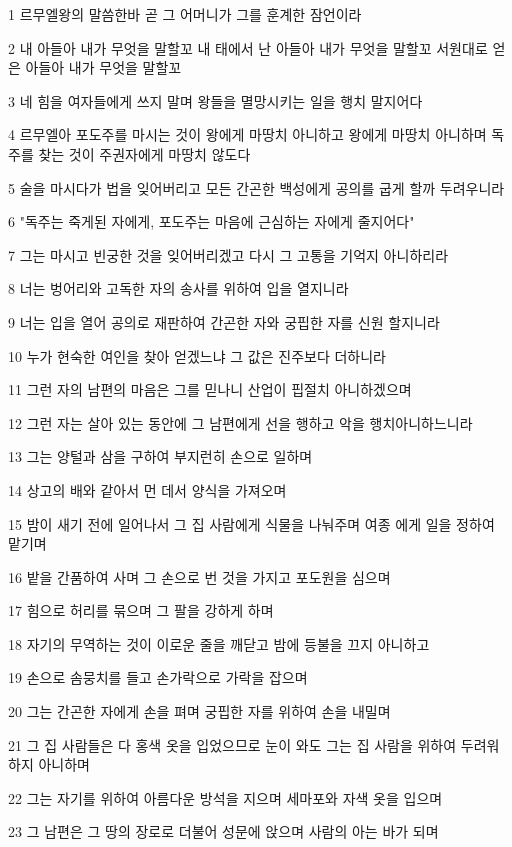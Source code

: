 \par 1 르무엘왕의 말씀한바 곧 그 어머니가 그를 훈계한 잠언이라
\par 2 내 아들아 내가 무엇을 말할꼬 내 태에서 난 아들아 내가 무엇을 말할꼬 서원대로 얻은 아들아 내가 무엇을 말할꼬
\par 3 네 힘을 여자들에게 쓰지 말며 왕들을 멸망시키는 일을 행치 말지어다
\par 4 르무엘아 포도주를 마시는 것이 왕에게 마땅치 아니하고 왕에게 마땅치 아니하며 독주를 찾는 것이 주권자에게 마땅치 않도다
\par 5 술을 마시다가 법을 잊어버리고 모든 간곤한 백성에게 공의를 굽게 할까 두려우니라
\par 6 "독주는 죽게된 자에게, 포도주는 마음에 근심하는 자에게 줄지어다"
\par 7 그는 마시고 빈궁한 것을 잊어버리겠고 다시 그 고통을 기억지 아니하리라
\par 8 너는 벙어리와 고독한 자의 송사를 위하여 입을 열지니라
\par 9 너는 입을 열어 공의로 재판하여 간곤한 자와 궁핍한 자를 신원 할지니라
\par 10 누가 현숙한 여인을 찾아 얻겠느냐 그 값은 진주보다 더하니라
\par 11 그런 자의 남편의 마음은 그를 믿나니 산업이 핍절치 아니하겠으며
\par 12 그런 자는 살아 있는 동안에 그 남편에게 선을 행하고 악을 행치아니하느니라
\par 13 그는 양털과 삼을 구하여 부지런히 손으로 일하며
\par 14 상고의 배와 같아서 먼 데서 양식을 가져오며
\par 15 밤이 새기 전에 일어나서 그 집 사람에게 식물을 나눠주며 여종 에게 일을 정하여 맡기며
\par 16 밭을 간품하여 사며 그 손으로 번 것을 가지고 포도원을 심으며
\par 17 힘으로 허리를 묶으며 그 팔을 강하게 하며
\par 18 자기의 무역하는 것이 이로운 줄을 깨닫고 밤에 등불을 끄지 아니하고
\par 19 손으로 솜뭉치를 들고 손가락으로 가락을 잡으며
\par 20 그는 간곤한 자에게 손을 펴며 궁핍한 자를 위하여 손을 내밀며
\par 21 그 집 사람들은 다 홍색 옷을 입었으므로 눈이 와도 그는 집 사람을 위하여 두려워하지 아니하며
\par 22 그는 자기를 위하여 아름다운 방석을 지으며 세마포와 자색 옷을 입으며
\par 23 그 남편은 그 땅의 장로로 더불어 성문에 앉으며 사람의 아는 바가 되며
